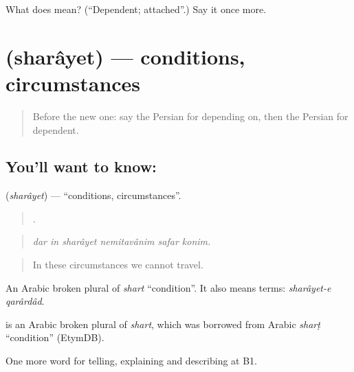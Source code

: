 \begin{tcolorbox}[breakable,colback=teal!4,colframe=teal!35!black,title={Before you move on}]
What does  mean? (\textquotedblleft{}Dependent; attached\textquotedblright{}.) Say it once more.
\end{tcolorbox}
\section[\texorpdfstring{\fa{شرایط} (sharâyet)}{شرایط (sharâyet)}]{ (sharâyet) — conditions, circumstances}

\label{lesson:FA-C395-sharayet}



\begin{quote}
Before the new one: say the Persian for depending on, then the Persian for dependent.
\end{quote}

\subsection*{You'll want to know: }
\textbf{} (\emph{sharâyet}) — \textquotedblleft{}conditions, circumstances\textquotedblright{}.

\begin{quote}
     .
\end{quote}

\begin{quote}
\emph{dar in sharâyet nemitavânim safar konim.}
\end{quote}

\begin{quote}
In these circumstances we cannot travel.
\end{quote}

An Arabic broken plural of \emph{shart} \textquotedblleft{}condition\textquotedblright{}. It also means terms: \emph{sharâyet-e qarârdâd}.

\begin{cousinweb}
\textbf{} is an Arabic broken plural of \emph{shart}, which was borrowed from Arabic \emph{sharṭ} \textquotedblleft{}condition\textquotedblright{} (EtymDB).
\end{cousinweb}

\begin{grammarlens}[title={What you've built}]
One more word for telling, explaining and describing at B1.
\end{grammarlens}


